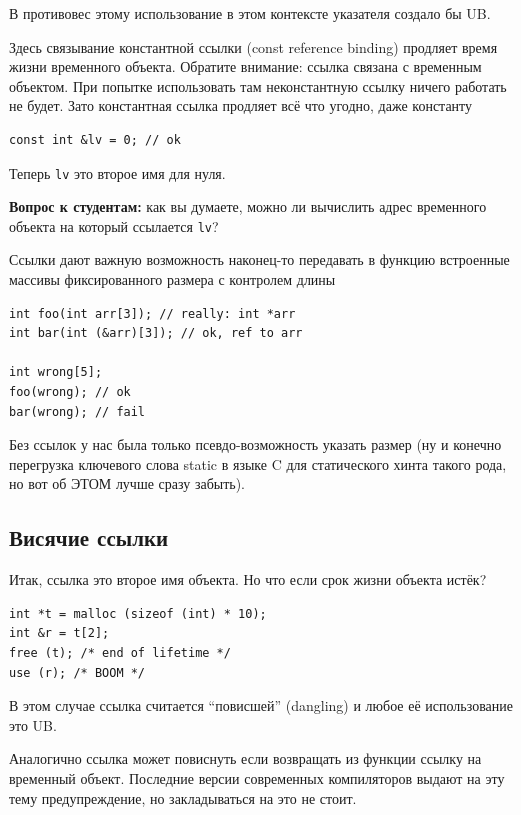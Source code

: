 \documentclass[a4paper,12pt,oneside]{book}
\newif\ifanswers
\begin{document}
В противовес этому использование в этом контексте указателя создало бы UB.

Здесь связывание константной ссылки (const reference binding) продляет время жизни временного объекта. Обратите внимание: ссылка связана с временным объектом. При попытке использовать там неконстантную ссылку ничего работать не будет. Зато константная ссылка продляет всё что угодно, даже константу

\begin{lstlisting}
const int &lv = 0; // ok
\end{lstlisting}

Теперь \lstinline!lv! это второе имя для нуля.

\textbf{Вопрос к студентам:} как вы думаете, можно ли вычислить адрес временного объекта на который ссылается \lstinline!lv!?

\ifanswers
Ответ: увы нет и, более того, сам этот объект не обязан существовать.
\fi

Ссылки дают важную возможность наконец-то передавать в функцию встроенные массивы фиксированного размера с контролем длины

\begin{lstlisting}
int foo(int arr[3]); // really: int *arr
int bar(int (&arr)[3]); // ok, ref to arr

int wrong[5];
foo(wrong); // ok
bar(wrong); // fail
\end{lstlisting}

Без ссылок у нас была только псевдо-возможность указать размер (ну и конечно перегрузка ключевого слова static в языке C для статического хинта такого рода, но вот об ЭТОМ лучше сразу забыть).

\subsection{Висячие ссылки}\label{DanglingRefs}

Итак, ссылка это второе имя объекта. Но что если срок жизни объекта истёк?

\begin{lstlisting}
int *t = malloc (sizeof (int) * 10);
int &r = t[2];
free (t); /* end of lifetime */
use (r); /* BOOM */ 
\end{lstlisting}

В этом случае ссылка считается ``повисшей'' (dangling) и любое её использование это UB.

Аналогично ссылка может повиснуть если возвращать из функции ссылку на временный объект. Последние версии современных компиляторов выдают на эту тему предупреждение, но закладываться на это не стоит.
\end{document}
